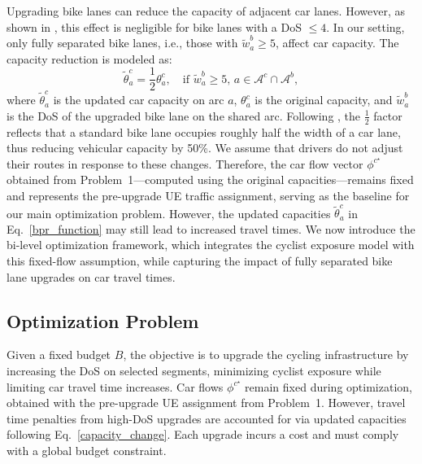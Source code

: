 \documentclass[letterpaper, 10 pt, conference]{ieeeconf}  %
\begin{document}
Upgrading bike lanes can reduce the capacity of adjacent car lanes. However, as shown in \cite{nanayakkara2022safe}, this effect is negligible for bike lanes with a DoS $\leq 4$. In our setting, only fully separated bike lanes, i.e., those with $\tilde{w}_{a}^{b} \geq 5$, affect car capacity. The capacity reduction is modeled as:
\begin{equation}
\label{capacity_change}
    \tilde{\theta}^{c}_{a} = \frac{1}{2} \theta^{c}_{a}, \quad \text{if } \tilde{w}_{a}^{b} \geq 5, \, a \in \mathcal{A}^{c} \cap \mathcal{A}^{b},
\end{equation}
where $\tilde{\theta}^{c}_{a}$ is the updated car capacity on arc $a$, $\theta^{c}_{a}$ is the original capacity, and $\tilde{w}_{a}^{b}$ is the DoS of the upgraded bike lane on the shared arc. Following \cite{wiedemann2025bike}, the $\frac{1}{2}$ factor reflects that a standard bike lane occupies roughly half the width of a car lane, thus reducing vehicular capacity by 50\%. We assume that drivers do not adjust their routes in response to these changes. Therefore, the car flow vector $\phi^{c^{\star}}$ obtained from Problem~1—computed using the original capacities—remains fixed and represents the pre-upgrade UE traffic assignment, serving as the baseline for our main optimization problem. However, the updated capacities $\tilde{\theta}^{c}_{a}$ in Eq.~\eqref{bpr_function} may still lead to increased travel times. We now introduce the bi-level optimization framework, which integrates the cyclist exposure model with this fixed-flow assumption, while capturing the impact of fully separated bike lane upgrades on car travel times.


\subsection{Optimization Problem}

Given a fixed budget $B$, the objective is to upgrade the cycling infrastructure by increasing the DoS on selected segments, minimizing cyclist exposure while limiting car travel time increases. Car flows $\phi^{c^{\star}}$ remain fixed during optimization, obtained with the pre-upgrade UE assignment from Problem~1. However, travel time penalties from high-DoS upgrades are accounted for via updated capacities following Eq.~\eqref{capacity_change}. Each upgrade incurs a cost and must comply with a global budget constraint.
\end{document}
